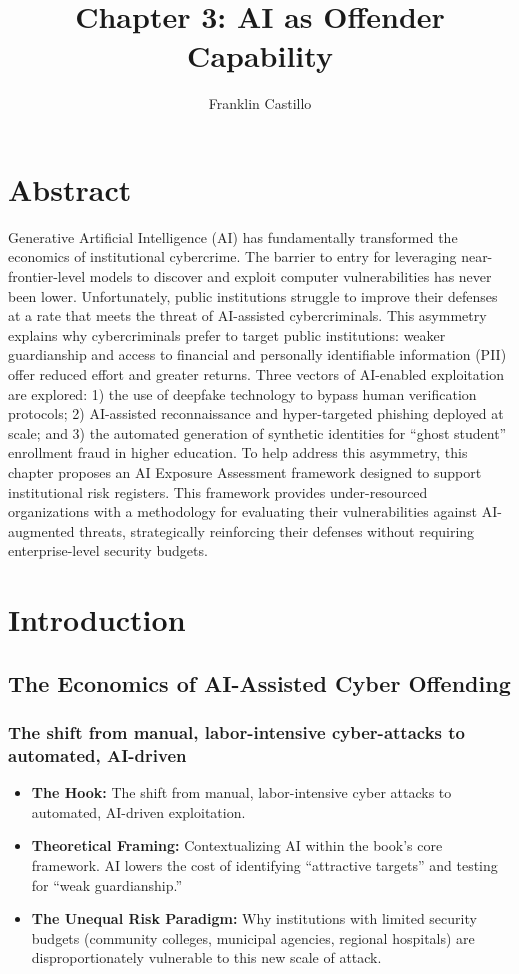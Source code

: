 \documentclass[11pt, a4paper]{article}
\title{\textbf{Chapter 3: AI as Offender Capability}}
\author{Franklin Castillo}
\date{}
\begin{document}
\maketitle

\section{Abstract}

Generative Artificial Intelligence (AI) has fundamentally transformed the economics of institutional cybercrime. The barrier to entry for leveraging near-frontier-level models to discover and exploit computer vulnerabilities has never been lower. Unfortunately, public institutions struggle to improve their defenses at a rate that meets the threat of AI-assisted cybercriminals. This asymmetry explains why cybercriminals prefer to target public institutions: weaker guardianship and access to financial and personally identifiable information (PII) offer reduced effort and greater returns. Three vectors of AI-enabled exploitation are explored: 1) the use of deepfake technology to bypass human verification protocols;  2) AI-assisted reconnaissance and hyper-targeted phishing deployed at scale; and 3) the automated generation of synthetic identities for ``ghost student'' enrollment fraud in higher education.
To help address this asymmetry, this chapter proposes an AI Exposure Assessment framework designed to support institutional risk registers. This framework provides under-resourced organizations with a methodology for evaluating their vulnerabilities against AI-augmented threats, strategically reinforcing their defenses without requiring enterprise-level security budgets.

\section{Introduction}

\subsection{The Economics of AI-Assisted Cyber Offending}
\subsubsection{The shift from manual, labor-intensive cyber-attacks to automated, AI-driven }
\begin{itemize}
    \item \textbf{The Hook:} The shift from manual, labor-intensive cyber attacks to automated, AI-driven exploitation.
    \item \textbf{Theoretical Framing:} Contextualizing AI within the book's core framework. AI lowers the cost of identifying ``attractive targets'' and testing for ``weak guardianship.''
    \item \textbf{The Unequal Risk Paradigm:} Why institutions with limited security budgets (community colleges, municipal agencies, regional hospitals) are disproportionately vulnerable to this new scale of attack.
\end{itemize}
\end{document}
